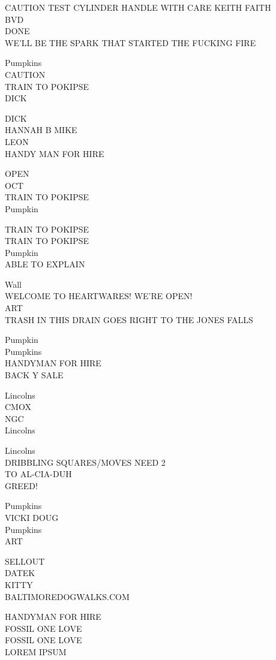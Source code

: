 \documentclass[10pt,letterpaper]{article}
\begin{document}
CAUTION TEST CYLINDER HANDLE WITH CARE KEITH FAITH\\
BVD\\
DONE\\
WE'LL BE THE SPARK THAT STARTED THE FUCKING FIRE

Pumpkins\\
CAUTION\\
TRAIN TO POKIPSE\\
DICK

DICK\\
HANNAH B MIKE\\
LEON\\
HANDY MAN FOR HIRE

OPEN\\
OCT\\
TRAIN TO POKIPSE\\
Pumpkin

TRAIN TO POKIPSE\\
TRAIN TO POKIPSE\\
Pumpkin\\
ABLE TO EXPLAIN

Wall\\
WELCOME TO HEARTWARES!  WE'RE OPEN!\\
ART\\
TRASH IN THIS DRAIN GOES RIGHT TO THE JONES FALLS

Pumpkin\\
Pumpkins\\
HANDYMAN FOR HIRE\\
BACK Y SALE

Lincolns\\
CMOX\\
NGC\\
Lincolns

Lincolns\\
DRIBBLING SQUARES/MOVES NEED 2\\
TO AL{-}CIA{-}DUH\\
GREED!

Pumpkins\\
VICKI DOUG\\
Pumpkins\\
ART

SELLOUT\\
DATEK\\
KITTY\\
BALTIMOREDOGWALKS.COM

HANDYMAN FOR HIRE\\
FOSSIL ONE LOVE\\
FOSSIL ONE LOVE\\
LOREM IPSUM
\end{document}
